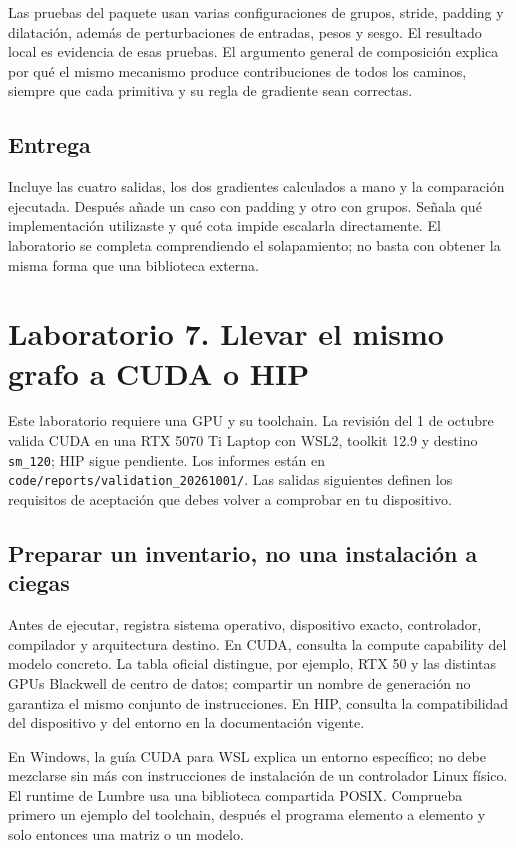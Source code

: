 \documentclass[12pt,a4paper,oneside]{report}
\begin{document}
Las pruebas del paquete usan varias configuraciones de grupos, stride, padding y dilatación, además de perturbaciones de entradas, pesos y sesgo. El resultado local es evidencia de esas pruebas. El argumento general de composición explica por qué el mismo mecanismo produce contribuciones de todos los caminos, siempre que cada primitiva y su regla de gradiente sean correctas.

\section{Entrega}
Incluye las cuatro salidas, los dos gradientes calculados a mano y la comparación ejecutada. Después añade un caso con padding y otro con grupos. Señala qué implementación utilizaste y qué cota impide escalarla directamente. El laboratorio se completa comprendiendo el solapamiento; no basta con obtener la misma forma que una biblioteca externa.

\chapter{Laboratorio 7. Llevar el mismo grafo a CUDA o HIP}
\label{lab:siete}
\begin{cuidado}
Este laboratorio requiere una GPU y su toolchain. La revisión del 1 de octubre valida CUDA en una RTX 5070 Ti Laptop con WSL2, toolkit 12.9 y destino \texttt{sm\_120}; HIP sigue pendiente. Los informes están en \texttt{code/reports\allowbreak{}/validation\_\allowbreak{}20261001/}. Las salidas siguientes definen los requisitos de aceptación que debes volver a comprobar en tu dispositivo.

\end{cuidado}
\section{Preparar un inventario, no una instalación a ciegas}
Antes de ejecutar, registra sistema operativo, dispositivo exacto, controlador, compilador y arquitectura destino. En CUDA, consulta la compute capability del modelo concreto. La tabla oficial distingue, por ejemplo, RTX 50 y las distintas GPUs Blackwell de centro de datos; compartir un nombre de generación no garantiza el mismo conjunto de instrucciones. En HIP, consulta la compatibilidad del dispositivo y del entorno en la documentación vigente. \cite{cuda-gpus,hip}

En Windows, la guía CUDA para WSL explica un entorno específico; no debe mezclarse sin más con instrucciones de instalación de un controlador Linux físico. El runtime de Lumbre usa una biblioteca compartida POSIX. Comprueba primero un ejemplo del toolchain, después el programa elemento a elemento y solo entonces una matriz o un modelo. \cite{cuda-wsl}
\end{document}
